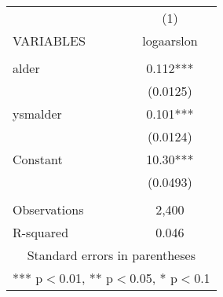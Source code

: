 \documentclass[]{article}
\begin{document}
\begin{tabular}{lc} \hline
 & (1) \\
VARIABLES & logaarslon \\ \hline
 &  \\
alder & 0.112*** \\
 & (0.0125) \\
ysmalder & 0.101*** \\
 & (0.0124) \\
Constant & 10.30*** \\
 & (0.0493) \\
 &  \\
Observations & 2,400 \\
 R-squared & 0.046 \\ \hline
\multicolumn{2}{c}{ Standard errors in parentheses} \\
\multicolumn{2}{c}{ *** p$<$0.01, ** p$<$0.05, * p$<$0.1} \\
\end{tabular}
\end{document}
